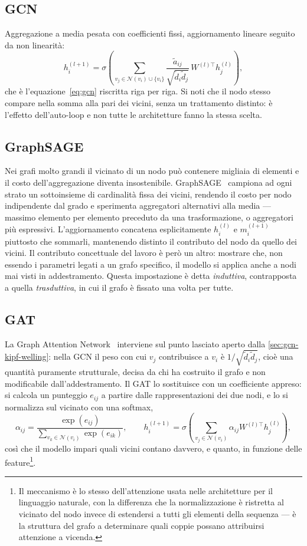 \subsection{GCN}
Aggregazione a media pesata con coefficienti fissi, aggiornamento lineare seguito da non linearità:
$$h_i^{(l+1)} = \sigma\!\left(\sum_{v_j\in\mathcal N(v_i)\cup\{v_i\}}\frac{\tilde a_{ij}}{\sqrt{\tilde d_i\tilde d_j}}\,W^{(l)\top}h_j^{(l)}\right),$$
che è l'equazione~\eqref{eq:gcn} riscritta riga per riga. Si noti che il nodo stesso compare nella somma alla pari dei vicini, senza un trattamento distinto: è l'effetto dell'auto-loop e non tutte le architetture fanno la stessa scelta.

\subsection{GraphSAGE}
Nei grafi molto grandi il vicinato di un nodo può contenere migliaia di elementi e il costo dell'aggregazione diventa insostenibile. GraphSAGE~\cite{hamilton2017graphsage} campiona ad ogni strato un sottoinsieme di cardinalità fissa dei vicini, rendendo il costo per nodo indipendente dal grado e sperimenta aggregatori alternativi alla media — massimo elemento per elemento preceduto da una trasformazione, o aggregatori più espressivi. L'aggiornamento concatena esplicitamente $h_i^{(l)}$ e $m_i^{(l+1)}$ piuttosto che sommarli, mantenendo distinto il contributo del nodo da quello dei vicini. Il contributo concettuale del lavoro è però un altro: mostrare che, non essendo i parametri legati a un grafo specifico, il modello si applica anche a nodi mai visti in addestramento. Questa impostazione è detta \emph{induttiva}, contrapposta a quella \emph{trasduttiva}, in cui il grafo è fissato una volta per tutte.

\subsection{GAT}
La Graph Attention Network~\cite{velickovic2018gat} interviene sul punto lasciato aperto dalla \cref{sec:gcn-kipf-welling}: nella GCN il peso con cui $v_j$ contribuisce a $v_i$ è $1/\sqrt{\tilde d_i\tilde d_j}$, cioè una quantità puramente strutturale, decisa da chi ha costruito il grafo e non modificabile dall'addestramento. Il GAT lo sostituisce con un coefficiente appreso: si calcola un punteggio $e_{ij}$ a partire dalle rappresentazioni dei due nodi, e lo si normalizza sul vicinato con una softmax,
\begin{equation}
\label{eq:gat-attention}
\alpha_{ij} = \frac{\exp(e_{ij})}{\sum_{v_k\in\mathcal N(v_i)}\exp(e_{ik})},\qquad h_i^{(l+1)} = \sigma\!\left(\sum_{v_j\in\mathcal N(v_i)}\alpha_{ij}W^{(l)\top}h_j^{(l)}\right),
\end{equation}
così che il modello impari quali vicini contano davvero, e quanto, in funzione delle feature\footnote{Il meccanismo è lo stesso dell'attenzione usata nelle architetture per il linguaggio naturale, con la differenza che la normalizzazione è ristretta al vicinato del nodo invece di estendersi a tutti gli elementi della sequenza — è la struttura del grafo a determinare quali coppie possano attribuirsi attenzione a vicenda.}.

